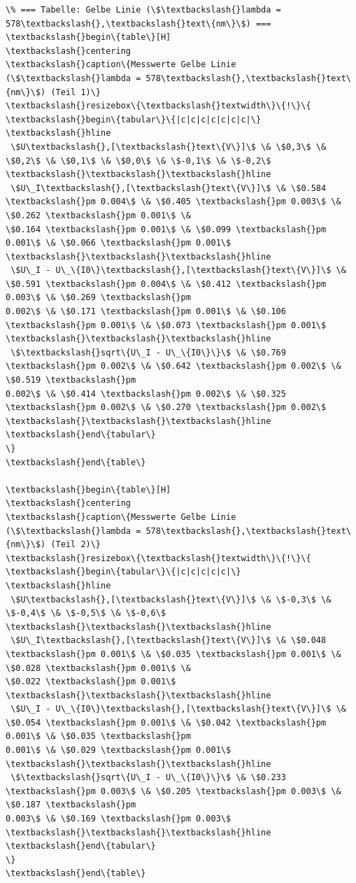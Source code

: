\begin{Verbatim}[commandchars=\\\{\}]
\% === Tabelle: Gelbe Linie (\$\textbackslash{}lambda = 578\textbackslash{},\textbackslash{}text\{nm\}\$) ===
\textbackslash{}begin\{table\}[H]
\textbackslash{}centering
\textbackslash{}caption\{Messwerte Gelbe Linie (\$\textbackslash{}lambda = 578\textbackslash{},\textbackslash{}text\{nm\}\$) (Teil 1)\}
\textbackslash{}resizebox\{\textbackslash{}textwidth\}\{!\}\{
\textbackslash{}begin\{tabular\}\{|c|c|c|c|c|c|c|\}
\textbackslash{}hline
 \$U\textbackslash{},[\textbackslash{}text\{V\}]\$ \& \$0,3\$ \& \$0,2\$ \& \$0,1\$ \& \$0,0\$ \& \$-0,1\$ \& \$-0,2\$ \textbackslash{}\textbackslash{}\textbackslash{}hline
 \$U\_I\textbackslash{},[\textbackslash{}text\{V\}]\$ \& \$0.584 \textbackslash{}pm 0.004\$ \& \$0.405 \textbackslash{}pm 0.003\$ \& \$0.262 \textbackslash{}pm 0.001\$ \&
\$0.164 \textbackslash{}pm 0.001\$ \& \$0.099 \textbackslash{}pm 0.001\$ \& \$0.066 \textbackslash{}pm 0.001\$ \textbackslash{}\textbackslash{}\textbackslash{}hline
 \$U\_I - U\_\{I0\}\textbackslash{},[\textbackslash{}text\{V\}]\$ \& \$0.591 \textbackslash{}pm 0.004\$ \& \$0.412 \textbackslash{}pm 0.003\$ \& \$0.269 \textbackslash{}pm
0.002\$ \& \$0.171 \textbackslash{}pm 0.001\$ \& \$0.106 \textbackslash{}pm 0.001\$ \& \$0.073 \textbackslash{}pm 0.001\$ \textbackslash{}\textbackslash{}\textbackslash{}hline
 \$\textbackslash{}sqrt\{U\_I - U\_\{I0\}\}\$ \& \$0.769 \textbackslash{}pm 0.002\$ \& \$0.642 \textbackslash{}pm 0.002\$ \& \$0.519 \textbackslash{}pm
0.002\$ \& \$0.414 \textbackslash{}pm 0.002\$ \& \$0.325 \textbackslash{}pm 0.002\$ \& \$0.270 \textbackslash{}pm 0.002\$ \textbackslash{}\textbackslash{}\textbackslash{}hline
\textbackslash{}end\{tabular\}
\}
\textbackslash{}end\{table\}

\textbackslash{}begin\{table\}[H]
\textbackslash{}centering
\textbackslash{}caption\{Messwerte Gelbe Linie (\$\textbackslash{}lambda = 578\textbackslash{},\textbackslash{}text\{nm\}\$) (Teil 2)\}
\textbackslash{}resizebox\{\textbackslash{}textwidth\}\{!\}\{
\textbackslash{}begin\{tabular\}\{|c|c|c|c|c|\}
\textbackslash{}hline
 \$U\textbackslash{},[\textbackslash{}text\{V\}]\$ \& \$-0,3\$ \& \$-0,4\$ \& \$-0,5\$ \& \$-0,6\$ \textbackslash{}\textbackslash{}\textbackslash{}hline
 \$U\_I\textbackslash{},[\textbackslash{}text\{V\}]\$ \& \$0.048 \textbackslash{}pm 0.001\$ \& \$0.035 \textbackslash{}pm 0.001\$ \& \$0.028 \textbackslash{}pm 0.001\$ \&
\$0.022 \textbackslash{}pm 0.001\$ \textbackslash{}\textbackslash{}\textbackslash{}hline
 \$U\_I - U\_\{I0\}\textbackslash{},[\textbackslash{}text\{V\}]\$ \& \$0.054 \textbackslash{}pm 0.001\$ \& \$0.042 \textbackslash{}pm 0.001\$ \& \$0.035 \textbackslash{}pm
0.001\$ \& \$0.029 \textbackslash{}pm 0.001\$ \textbackslash{}\textbackslash{}\textbackslash{}hline
 \$\textbackslash{}sqrt\{U\_I - U\_\{I0\}\}\$ \& \$0.233 \textbackslash{}pm 0.003\$ \& \$0.205 \textbackslash{}pm 0.003\$ \& \$0.187 \textbackslash{}pm
0.003\$ \& \$0.169 \textbackslash{}pm 0.003\$ \textbackslash{}\textbackslash{}\textbackslash{}hline
\textbackslash{}end\{tabular\}
\}
\textbackslash{}end\{table\}


    \end{Verbatim}

